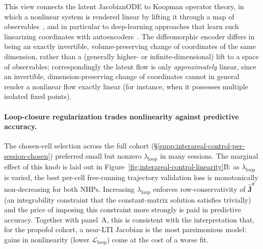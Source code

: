 This view connects the latent JacobianODE to Koopman operator theory, in which a nonlinear system is rendered linear by lifting it through a map of observables~\cite{Mezic2005-dd,Brunton2022-xb}, and in particular to deep-learning approaches that learn such linearizing coordinates with autoencoders~\cite{Lusch2018-zs,Alford-Lago2022-ct}. The diffeomorphic encoder differs in being an exactly invertible, volume-preserving change of coordinates of the same dimension, rather than a (generally higher- or infinite-dimensional) lift to a space of observables; correspondingly the latent flow is only \emph{approximately} linear, since an invertible, dimension-preserving change of coordinates cannot in general render a nonlinear flow exactly linear (for instance, when it possesses multiple isolated fixed points).

\paragraph{Loop-closure regularization trades nonlinearity against predictive accuracy.}
The chosen-cell selection across the full cohort (\S\ref{supp:interareal-control-per-session-chosen}) preferred small but nonzero $\lambda_{\mathrm{loop}}$ in many sessions. The marginal effect of this knob is laid out in Figure~\ref{fig:interareal-control-linearity}B: as $\lambda_{\mathrm{loop}}$ is varied, the best per-cell free-running trajectory validation loss is monotonically non-decreasing for both NHPs. Increasing $\lambda_{\mathrm{loop}}$ enforces row-conservativity of $\hat{\mathbf{J}}^{\theta}$ (an integrability constraint that the constant-matrix solution satisfies trivially) and the price of imposing this constraint more strongly is paid in predictive accuracy. Together with panel~A, this is consistent with the interpretation that, for the propofol cohort, a near-LTI Jacobian is the most parsimonious model: gains in nonlinearity (lower $\mathcal{L}_{\mathrm{loop}}$) come at the cost of a worse fit.


